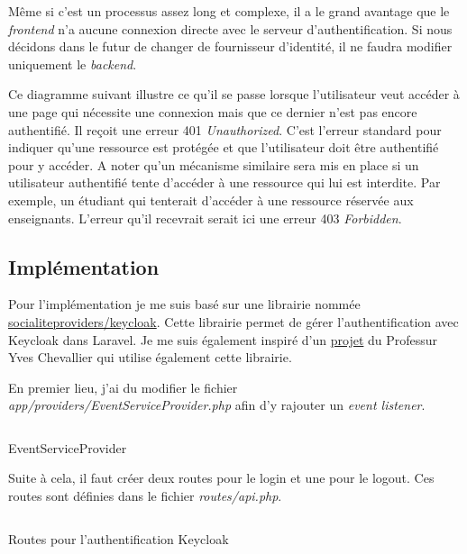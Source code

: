 Même si c'est un processus assez long et complexe, il a le grand avantage que le \emph{frontend} n'a aucune connexion directe avec le serveur d'authentification. Si nous décidons dans le futur de changer de fournisseur d'identité, il ne faudra modifier uniquement le \emph{backend}.


Ce diagramme suivant illustre ce qu'il se passe lorsque l'utilisateur veut accéder à une page qui nécessite une connexion mais que ce dernier n'est pas encore authentifié. Il reçoit une erreur 401 \emph{Unauthorized}. C'est l'erreur standard pour indiquer qu'une ressource est protégée et que l'utilisateur doit être authentifié pour y accéder. A noter qu'un mécanisme similaire sera mis en place si un utilisateur authentifié tente d'accéder à une ressource qui lui est interdite. Par exemple, un étudiant qui tenterait d'accéder à une ressource réservée aux enseignants. L'erreur qu'il recevrait serait ici une erreur 403 \emph{Forbidden}.

\subsection{Implémentation}
Pour l'implémentation je me suis basé sur une librairie nommée \href{https://socialiteproviders.com/Keycloak/#installation-basic-usage}{socialiteproviders/keycloak}. Cette librairie permet de gérer l'authentification avec Keycloak dans Laravel. Je me suis également inspiré d'un \href{https://github.com/heig-vd-tin/fablab-name}{projet} du Professur Yves Chevallier qui utilise également cette librairie.

En premier lieu, j'ai du modifier le fichier \emph{app/providers/EventServiceProvider.php} afin d'y rajouter un \emph{event listener}.
\begin{listing}[H]
    \inputminted{php}{assets/code/serviceProviderkeycloak.php}
    \caption{EventServiceProvider \label{serviceProviderkeycloak}}
\end{listing}

Suite à cela, il faut créer deux routes pour le login et une pour le logout. Ces routes sont définies dans le fichier \emph{routes/api.php}.

\begin{listing}[H]
    \inputminted{php}{assets/code/routeKeycloak.php}
    \caption{Routes pour l'authentification Keycloak \label{routeKeycloak}}
\end{listing}

